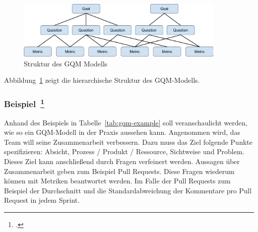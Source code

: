 \begin{savenotes}
  \begin{figure}[H] 
    \centering
    \includegraphics[width=0.9\textwidth]{img/gqm.png}
    \caption{Struktur des \ac{GQM} Modells}\label{fig:gqm}
  \end{figure}
\end{savenotes}

Abbildung~\ref{fig:gqm} zeigt die hierarchische Struktur des \ac{GQM}-Modells.

\clearpage
\subsubsection*{Beispiel~\footcite[][]{basili_goal_nodate}}

Anhand des Beispiels in Tabelle~\ref{tab:gqm-example} soll veranschaulicht werden, wie so ein GQM-Modell in der Praxis aussehen kann.
Angenommen wird, das Team will seine Zusammenarbeit verbessern. 
Dazu muss das Ziel folgende Punkte spezifizieren: Absicht, Prozess / Produkt / Ressource, Sichtweise und Problem.
Dieses Ziel kann anschließend durch Fragen verfeinert werden.
Aussagen über Zusammenarbeit geben zum Beispiel Pull Requests.
Diese Fragen wiederum können mit Metriken beantwortet werden.
Im Falle der Pull Requests zum Beispiel der Durchschnitt und die Standardabweichung der Kommentare pro Pull Request in jedem Sprint.

